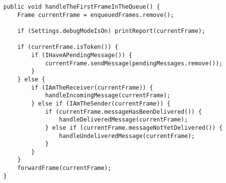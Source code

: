 \begin{lstlisting}
public void handleTheFirstFrameInTheQueue() {
    Frame currentFrame = enqueuedFrames.remove();

    if (Settings.debugModeIsOn) printReport(currentFrame);

    if (currentFrame.isToken()) {
        if (IHaveAPendingMessage()) {
            currentFrame.sendMessage(pendingMessages.remove());
        }
    } else {
        if (IAmTheReceiver(currentFrame)) {
            handleIncomingMessage(currentFrame);
        } else if (IAmTheSender(currentFrame)) {
            if (currentFrame.messageHasBeenDelivered()) {
                handleDeliveredMessage(currentFrame);
            } else if (currentFrame.messageNotYetDelivered()) {
                handleUndeliveredMessage(currentFrame);
            }
        }
    }
    forwardFrame(currentFrame);
}
\end{lstlisting}
